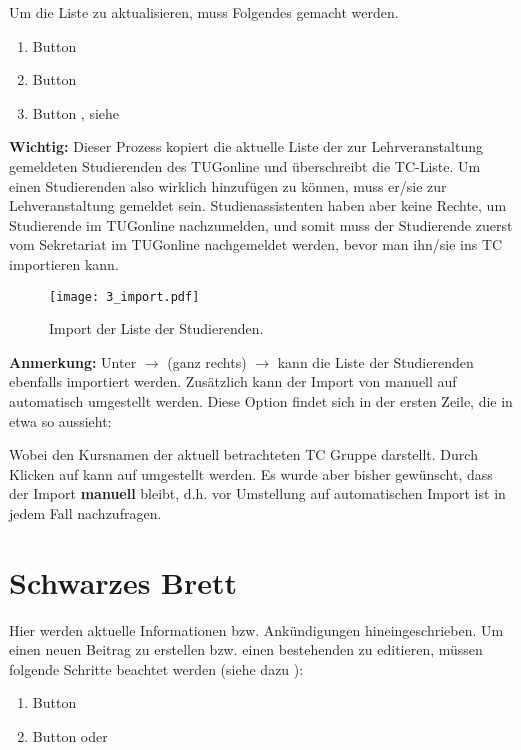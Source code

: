 Um die Liste zu aktualisieren, muss Folgendes gemacht werden.
\begin{enumerate}
\item Button 
\item Button 
\item Button , siehe 
\end{enumerate}

{\bf Wichtig:} Dieser Prozess kopiert die aktuelle Liste der zur
Lehrveranstaltung gemeldeten Studierenden des TUGonline und überschreibt die
TC-Liste. Um einen Studierenden also wirklich hinzufügen zu können, muss er/sie
zur Lehveranstaltung gemeldet sein. Studienassistenten haben aber keine Rechte,
um Studierende im TUGonline nachzumelden, und somit muss der Studierende zuerst
vom Sekretariat im TUGonline  nachgemeldet werden, bevor man ihn/sie ins TC
importieren kann.

\begin{figure}[htbp]
  \begin{center}
  \texttt{[image: 3\_import.pdf]}
  \caption{ Import der Liste der Studierenden.}
  \label{fig:import}
  \end{center}
\end{figure}

{\bf Anmerkung:} Unter  $\to$ 
(ganz rechts) $\to$  kann die Liste der Studierenden ebenfalls
importiert werden. Zusätzlich kann der Import von manuell auf automatisch 
umgestellt werden. Diese Option findet sich in der ersten Zeile, die in etwa
so aussieht:\newline
{}

Wobei  den Kursnamen der aktuell betrachteten TC Gruppe
darstellt. Durch Klicken auf  kann auf
 umgestellt werden. Es wurde aber bisher
gewünscht, dass der Import {\bf manuell} bleibt, d.h. vor Umstellung auf 
automatischen Import ist in jedem Fall nachzufragen.

\section{Schwarzes Brett}

Hier werden aktuelle Informationen bzw. Ankündigungen hineingeschrieben. Um
einen neuen Beitrag zu erstellen bzw. einen bestehenden zu editieren, müssen
folgende Schritte beachtet werden (siehe dazu ):
\begin{enumerate}
\item Button 
\item Button  oder 
\end{enumerate}

